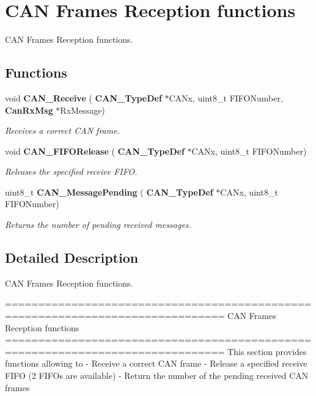 \section{C\+AN Frames Reception functions}
\label{group__CAN__Group3}


C\+AN Frames Reception functions.  


\subsection*{Functions}
\begin{DoxyCompactItemize}
\item 
void \textbf{ C\+A\+N\+\_\+\+Receive} (\textbf{ C\+A\+N\+\_\+\+Type\+Def} $\ast$C\+A\+Nx, uint8\+\_\+t F\+I\+F\+O\+Number, \textbf{ Can\+Rx\+Msg} $\ast$Rx\+Message)
\begin{DoxyCompactList}\small\item\em Receives a correct C\+AN frame. \end{DoxyCompactList}\item 
void \textbf{ C\+A\+N\+\_\+\+F\+I\+F\+O\+Release} (\textbf{ C\+A\+N\+\_\+\+Type\+Def} $\ast$C\+A\+Nx, uint8\+\_\+t F\+I\+F\+O\+Number)
\begin{DoxyCompactList}\small\item\em Releases the specified receive F\+I\+FO. \end{DoxyCompactList}\item 
uint8\+\_\+t \textbf{ C\+A\+N\+\_\+\+Message\+Pending} (\textbf{ C\+A\+N\+\_\+\+Type\+Def} $\ast$C\+A\+Nx, uint8\+\_\+t F\+I\+F\+O\+Number)
\begin{DoxyCompactList}\small\item\em Returns the number of pending received messages. \end{DoxyCompactList}\end{DoxyCompactItemize}


\subsection{Detailed Description}
C\+AN Frames Reception functions. 

\begin{DoxyVerb} ===============================================================================
                      CAN Frames Reception functions
 ===============================================================================  
  This section provides functions allowing to 
   -  Receive a correct CAN frame
   -  Release a specified receive FIFO (2 FIFOs are available)
   -  Return the number of the pending received CAN frames\end{DoxyVerb}
 

